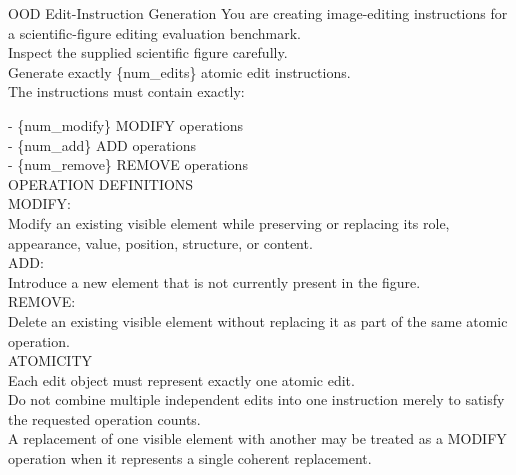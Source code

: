 \begin{PromptBox}{OOD Edit-Instruction Generation}
You are creating image-editing instructions for a scientific-figure editing evaluation benchmark. \\

Inspect the supplied scientific figure carefully. \\

Generate exactly \{num\_edits\} atomic edit instructions. \\

The instructions must contain exactly:

- \{num\_modify\} MODIFY operations \\
- \{num\_add\} ADD operations \\
- \{num\_remove\} REMOVE operations \\

OPERATION DEFINITIONS \\

MODIFY: \\
Modify an existing visible element while preserving or replacing its role, appearance, value, position, structure, or content. \\

ADD: \\
Introduce a new element that is not currently present in the figure. \\

REMOVE: \\
Delete an existing visible element without replacing it as part of the same atomic operation. \\

ATOMICITY \\
Each edit object must represent exactly one atomic edit. \\
Do not combine multiple independent edits into one instruction merely to satisfy the requested operation counts. \\
A replacement of one visible element with another may be treated as a MODIFY operation when it represents a single coherent replacement. \\


\end{PromptBox}
